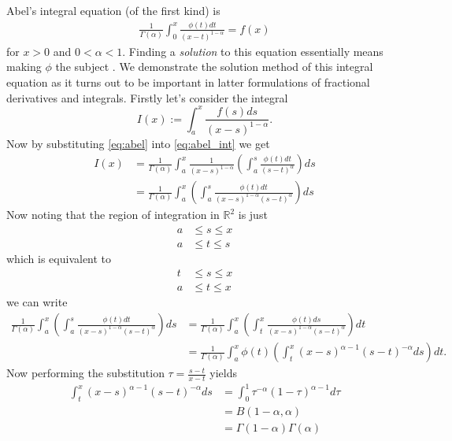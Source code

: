Abel's integral equation (of the first kind) is 
\begin{align}
    \label{eq:abel}
    \frac{1}{\Gamma(\alpha)} \int_0^x \frac{\phi(t)dt}{(x-t)^{1-\alpha}} = f(x) 
\end{align}
for $ x > 0 $ and $ 0 < \alpha < 1 $. Finding a \emph{solution} to this equation essentially means making $ \phi $ the subject \cite{Samko1993}. 
We demonstrate the solution method of this integral equation as it turns out to be important in latter formulations of fractional derivatives and integrals.
Firstly let's consider the integral 
\begin{equation}
	\label{eq:abel_int}
	I(x) := \int_a^x \frac{f(s)ds}{(x-s)^{1-\alpha}}.
\end{equation}
Now by substituting \eqref{eq:abel} into \eqref{eq:abel_int} we get 
\begin{align}
	I(x) &= \frac{1}{\Gamma(\alpha)} \int_a^x \frac{1}{(x-s)^{1-\alpha}} \left( \int_a^s \frac{\phi(t)dt}{(s-t)^\alpha} \right) ds \\
		&= \frac{1}{\Gamma(\alpha)} \int_a^x \left( \int_a^s \frac{\phi(t)dt}{(x-s)^{1-\alpha}(s-t)^\alpha} \right) ds
\end{align}
Now noting that the region of integration in $ \mathbb{R}^2 $ is just
\begin{align}
	a &\leq s \leq x \\
	a &\leq t \leq s 
\end{align}
which is equivalent to 
\begin{align}
	t &\leq s \leq x \\
	a &\leq t \leq x 
\end{align}
we can write 
\begin{align}
	\frac{1}{\Gamma(\alpha)} \int_a^x \left( \int_a^s \frac{\phi(t)dt}{(x-s)^{1-\alpha}(s-t)^\alpha} \right) ds 
		&= \frac{1}{\Gamma(\alpha)} \int_a^x \left( \int_t^x \frac{\phi(t)ds}{(x-s)^{1-\alpha}(s-t)^\alpha} \right) dt \nonumber \\
		\label{eqn:prebeta}
		&= \frac{1}{\Gamma(\alpha)} \int_a^x \phi(t) \left( \int_t^x (x-s)^{\alpha-1}(s-t)^{-\alpha} ds\right) dt. 
\end{align}
Now performing the substitution $ \tau = \frac{s-t}{x-t} $ yields 
\begin{align}
	\int_t^x (x-s)^{\alpha-1}(s-t)^{-\alpha} ds &= \int_0^1 \tau^{-\alpha} (1-\tau)^{\alpha - 1} d\tau \\
		&= B(1-\alpha,\alpha) \\
		&= \Gamma(1-\alpha)\Gamma(\alpha)
\end{align}
